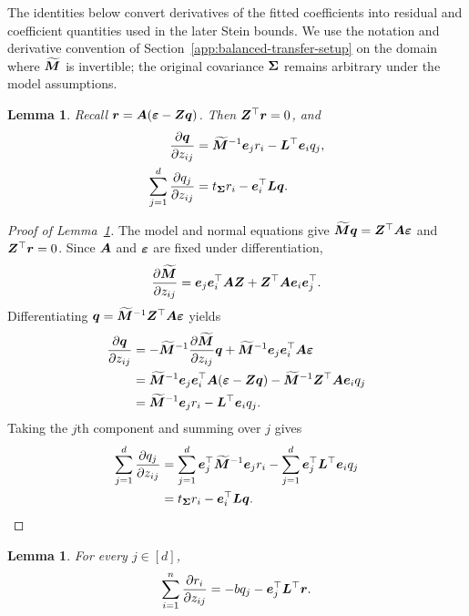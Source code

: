 \documentclass{article}
\theoremstyle{plain} %
\newtheorem{lemma}[theorem]{Lemma}
\theoremstyle{definition} %
\theoremstyle{definition} %
\begin{document}
\label{app:intermediate-result-proofs}

The identities below convert derivatives of the fitted coefficients into
residual and coefficient quantities used in the later Stein bounds. We
use the notation and derivative convention of
Section~\ref{app:balanced-transfer-setup} on the domain where
$\widetilde{\boldsymbol{M}}$ is invertible; the original covariance $\boldsymbol{\Sigma}$
remains arbitrary under the model assumptions.

\begin{lemma}\label{lem:dot-beta}
Recall $\boldsymbol{r}=\boldsymbol{A}({\boldsymbol{\varepsilon} }-\boldsymbol{Z}\boldsymbol{q})$.  Then $\boldsymbol{Z}^\top\boldsymbol{r}=0$, and
\begin{align*}
    \pdv{\boldsymbol{q}}{z_{ij}}
    &=\widetilde{\boldsymbol{M}}^{-1}\boldsymbol{e}_jr_i-\boldsymbol{L}^\top\boldsymbol{e}_iq_j,\\
    \sum_{j=1}^d\pdv{q_j}{z_{ij}}
    &=t_{\boldsymbol{\Sigma}}r_i-\boldsymbol{e}_i^\top\boldsymbol{L}\boldsymbol{q}.
\end{align*}
\end{lemma}

\begin{proof}[Proof of Lemma~\ref{lem:dot-beta}]
The model and normal equations give
$\widetilde{\boldsymbol{M}}\boldsymbol{q}=\boldsymbol{Z}^\top\boldsymbol{A}{\boldsymbol{\varepsilon} }$ and $\boldsymbol{Z}^\top\boldsymbol{r}=0$.
Since $\boldsymbol{A}$ and ${\boldsymbol{\varepsilon} }$ are fixed under differentiation,
\begin{align*}
    \pdv{\widetilde{\boldsymbol{M}}}{z_{ij}}
    =\boldsymbol{e}_j\boldsymbol{e}_i^\top\boldsymbol{A}\boldsymbol{Z}+\boldsymbol{Z}^\top\boldsymbol{A}\boldsymbol{e}_i\boldsymbol{e}_j^\top.
\end{align*}
Differentiating $\boldsymbol{q}=\widetilde{\boldsymbol{M}}^{-1}\boldsymbol{Z}^\top\boldsymbol{A}{\boldsymbol{\varepsilon} }$ yields
\begin{align*}
    \pdv{\boldsymbol{q}}{z_{ij}}
    &=-\widetilde{\boldsymbol{M}}^{-1}
       \pdv{\widetilde{\boldsymbol{M}}}{z_{ij}}\boldsymbol{q}
       +\widetilde{\boldsymbol{M}}^{-1}\boldsymbol{e}_j\boldsymbol{e}_i^\top\boldsymbol{A}{\boldsymbol{\varepsilon} }\\
    &=\widetilde{\boldsymbol{M}}^{-1}\boldsymbol{e}_j
       \boldsymbol{e}_i^\top\boldsymbol{A}({\boldsymbol{\varepsilon} }-\boldsymbol{Z}\boldsymbol{q})
       -\widetilde{\boldsymbol{M}}^{-1}\boldsymbol{Z}^\top\boldsymbol{A}\boldsymbol{e}_iq_j\\
    &=\widetilde{\boldsymbol{M}}^{-1}\boldsymbol{e}_jr_i-\boldsymbol{L}^\top\boldsymbol{e}_iq_j.
\end{align*}
Taking the $j$th component and summing over $j$ gives
\begin{align*}
    \sum_{j=1}^d\pdv{q_j}{z_{ij}}
    &=\sum_{j=1}^d\boldsymbol{e}_j^\top\widetilde{\boldsymbol{M}}^{-1}\boldsymbol{e}_jr_i
       -\sum_{j=1}^d\boldsymbol{e}_j^\top\boldsymbol{L}^\top\boldsymbol{e}_iq_j\\
    &=t_{\boldsymbol{\Sigma}}r_i-\boldsymbol{e}_i^\top\boldsymbol{L}\boldsymbol{q}.
\end{align*}
\end{proof}

\begin{lemma}\label{lem:dot-r}
For every $j\in[d]$,
\begin{align*}
    \sum_{i=1}^n\pdv{r_i}{z_{ij}}
    =-bq_j-\boldsymbol{e}_j^\top\boldsymbol{L}^\top\boldsymbol{r}.
\end{align*}
\end{lemma}
\end{document}
